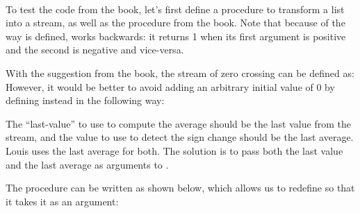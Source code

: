 \begin{exe}[3.74]
    \ \vspace{-20pt}
    \begin{comp}
        To test the code from the book, let’s first define a procedure to 
        transform a list into a stream, as well as the 
         procedure from the book. Note that because 
        of the way  is defined, 
         works backwards: it returns 1 when its first 
        argument is positive and the second is negative and vice-versa.
    \end{comp}
    With the suggestion from the book, the stream of zero crossing can be 
    defined as:
    However, it would be better to avoid adding an arbitrary initial value of 
    0 by defining  instead in the following way:
\end{exe}

\begin{exe}[3.75]
    The “last-value” to use to compute the average should be the last value from 
    the  stream, and the value to use to detect the sign change 
    should be the last average. Louis uses the last average for both. The 
    solution is to pass both the last value and the last average as arguments to 
    .
\end{exe}

\begin{exe}[3.76]
    The  procedure can be written as shown below, which allows us 
    to redefine  so that it takes it as an argument:
\end{exe}
